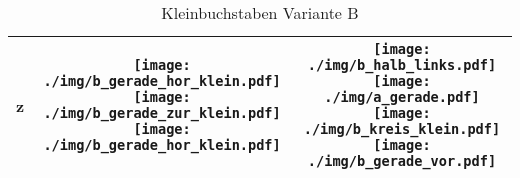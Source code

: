 \begin{table}[!h]
\begin{center}
\begin{tabular}{ m{2cm} | c | c }
	z &
	\texttt{[image: ./img/b\_gerade\_hor\_klein.pdf]}
	\texttt{[image: ./img/b\_gerade\_zur\_klein.pdf]}	
	\texttt{[image: ./img/b\_gerade\_hor\_klein.pdf]}
	&
	\texttt{[image: ./img/b\_halb\_links.pdf]}
	\texttt{[image: ./img/a\_gerade.pdf]}	
	\texttt{[image: ./img/b\_kreis\_klein.pdf]}
	\texttt{[image: ./img/b\_gerade\_vor.pdf]}
	\\ \hline




    \end{tabular}
  \end{center}
  \caption{Kleinbuchstaben Variante B}
  \label{aufbau_buchsatben}
\end{table}